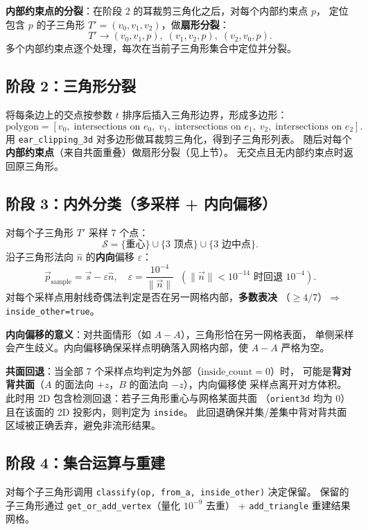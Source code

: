 \documentclass[11pt,a4paper]{article}
\begin{document}
\textbf{内部约束点的分裂}：在阶段 2 的耳裁剪三角化之后，对每个内部约束点 $p$，
定位包含 $p$ 的子三角形 $T' = (v_0, v_1, v_2)$，做\textbf{扇形分裂}：
\[
  T' \to (v_0, v_1, p),\;(v_1, v_2, p),\;(v_2, v_0, p).
\]
多个内部约束点逐个处理，每次在当前子三角形集合中定位并分裂。

\subsection{阶段 2：三角形分裂}

将每条边上的交点按参数 $t$ 排序后插入三角形边界，形成多边形：
\[
  \text{polygon} = [v_0,\; \text{intersections on } e_0,\; v_1,\;
  \text{intersections on } e_1,\; v_2,\; \text{intersections on } e_2].
\]
用 \texttt{ear\_clipping\_3d} 对多边形做耳裁剪三角化，得到子三角形列表。
随后对每个\textbf{内部约束点}（来自共面重叠）做扇形分裂（见上节）。
无交点且无内部约束点时返回原三角形。

\subsection{阶段 3：内外分类（多采样 + 内向偏移）}

对每个子三角形 $T'$ 采样 7 个点：
\[
  \mathcal{S} = \{\text{重心}\} \cup \{3 \text{ 顶点}\} \cup \{3 \text{ 边中点}\}.
\]
沿子三角形法向 $\hat{n}$ 的\textbf{内向}偏移 $\varepsilon$：
\[
  \vec{p}_{\text{sample}} = \vec{s} - \varepsilon \hat{n},\quad
  \varepsilon = \frac{10^{-4}}{\|\vec{n}\|}\;\;(\|\vec{n}\| < 10^{-14} \text{ 时回退 } 10^{-4}).
\]
对每个采样点用射线奇偶法判定是否在另一网格内部，\textbf{多数表决}
（$\ge 4/7$）$\Rightarrow$ \texttt{inside\_other=true}。

\textbf{内向偏移的意义}：对共面情形（如 $A - A$），三角形恰在另一网格表面，
单侧采样会产生歧义。内向偏移确保采样点明确落入网格内部，使
$A - A$ 严格为空。

\textbf{共面回退}：当全部 7 个采样点均判定为外部（$\text{inside\_count} = 0$）时，
可能是\textbf{背对背共面}（$A$ 的面法向 $+z$，$B$ 的面法向 $-z$），内向偏移使
采样点离开对方体积。此时用 2D 包含检测回退：若子三角形重心与网格某面共面
（\texttt{orient3d} 均为 0）且在该面的 2D 投影内，则判定为 \texttt{inside}。
此回退确保并集/差集中背对背共面区域被正确丢弃，避免非流形结果。

\subsection{阶段 4：集合运算与重建}

对每个子三角形调用 \texttt{classify(op, from\_a, inside\_other)} 决定保留。
保留的子三角形通过 \texttt{get\_or\_add\_vertex}（量化 $10^{-9}$ 去重）
+ \texttt{add\_triangle} 重建结果网格。
\end{document}
